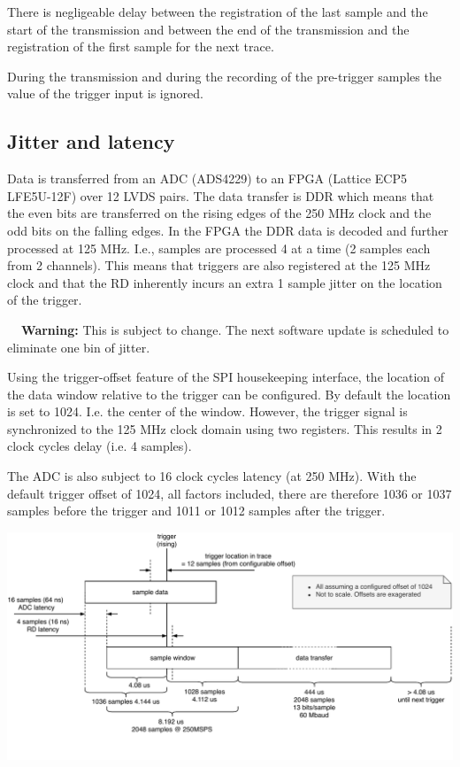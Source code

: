 \documentclass[a4paper,indent]{paper}
\newenvironment{warning}
{\par\begin{mdframed}[linewidth=2pt,linecolor=orange,backgroundcolor=orange!10]%
    \begin{list}{}{\leftmargin=0mm}\item[\bf\danger{}~~Warning: ]}
  {\end{list}\end{mdframed}\par}
\begin{document}
There is negligeable delay between the registration of the last sample and the start of the transmission and between the end of the transmission and the registration of the first sample for the next trace.

During the transmission and during the recording of the pre-trigger samples the value of the trigger input is ignored.



\subsection{Jitter and latency}\label{sec:latency}
Data is transferred from an \ac{ADC} (ADS4229) to an \ac{FPGA} (Lattice ECP5 LFE5U-12F) over 12 LVDS pairs. The data transfer is \ac{DDR} which means that the even bits are transferred on the rising edges of the 250 MHz clock and the odd bits on the falling edges. In the \ac{FPGA} the \ac{DDR} data is decoded and further processed at 125 MHz. I.e., samples are processed 4 at a time (2 samples each from 2 channels). This means that triggers are also registered at the 125 MHz clock and that the RD inherently incurs an extra 1 sample jitter on the location of the trigger.
\begin{warning}
  This is subject to change. The next software update is scheduled to eliminate one bin of jitter.
\end{warning}


Using the trigger-offset feature of the \ac{SPI} housekeeping interface, the location of the data window relative to the trigger can be configured. By default the location is set to 1024. I.e. the center of the window. However, the trigger signal is synchronized to the 125 MHz clock domain using two registers. This results in 2 clock cycles delay (i.e. 4 samples).

The \ac{ADC} is also subject to 16 clock cycles latency (at 250 MHz). With the default trigger offset of 1024, all factors included, there are therefore 1036 or 1037 samples before the trigger and 1011 or 1012 samples after the trigger.


\begin{center}
  \includegraphics[width=\textwidth]{img/rd_timing.pdf}
  \label{fig:rd_timing}
\end{center}
\end{document}
